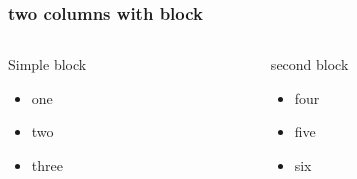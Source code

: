 \documentclass[bigger, presentation]{beamer}
\begin{document}
\begin{frame}
\frametitle{two columns with block}
\label{sec-6-3}
\begin{columns}
\begin{column}{0.5\textwidth}
\begin{block}{Simple block}
\label{sec-6-3-1}

\begin{itemize}
\item one
\item two
\item three
\end{itemize}
\end{block}
\end{column}
\begin{column}{0.5\textwidth}
\begin{block}{second block}
\label{sec-6-3-2}

\begin{itemize}
\item four
\item five
\item six
\end{itemize}
\end{block}
\end{column}
\end{columns}
\end{frame}
\end{document}
